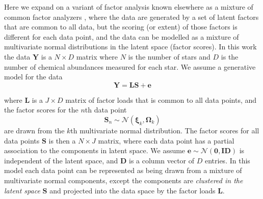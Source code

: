 \documentclass[twocolumn]{aastex62}
\newcommand{\vect}[1]{\boldsymbol{\mathbf{#1}}}
\renewcommand{\vec}[1]{\vect{#1}}
\newcommand{\data}{\textbf{Y}}
\newcommand{\vecdata}{\vec\data}
\newcommand{\eye}{\textbf{I}}
\newcommand{\factorloads}{\textbf{L}}
\newcommand{\factorscores}{\textbf{S}}
\newcommand{\specificvariance}{\vec{D}}
\newcommand{\NumData}{N}
\newcommand{\NumDimensions}{D}
\newcommand{\numdata}{n}
\newcommand{\NumLatentFactors}{J}
\newcommand{\numcomponents}{k}
\begin{document}
Here we expand on a variant of factor analysis known elsewhere as a mixture of common 
factor analyzers \citep{Baek:2010}, where the data are generated by a set of 
latent factors that are common to all data, but the scoring (or extent) of those
factors is different for each data point, and the data can be modelled as a
mixture of multivariate normal distributions in the latent space (factor scores).
In this work the data $\vecdata$ is a 
$\NumData \times \NumDimensions$ matrix where $\NumData$ is the number of 
stars and $\NumDimensions$ is the number of chemical abundances measured 
for each star. We assume a generative model for the data 
\begin{equation}
	\vecdata = \factorloads\factorscores + \vec{e}
	\label{eq:generative-model}
\end{equation}

\noindent{}where $\factorloads$ is a $\NumLatentFactors \times \NumDimensions$ 
matrix of factor loads that is common to all data points, and the factor scores 
for the $\numdata$th data point
\begin{equation}
	\factorscores_\numdata \sim \mathcal{N}(\vec\xi_\numcomponents, \vec\Omega_\numcomponents)
\end{equation}
\noindent{}are drawn from the $\numcomponents$th multivariate normal distribution.
The factor scores for all data points $\factorscores$ is then a 
$\NumData \times \NumLatentFactors$ matrix, where each data point has a partial
association to the components in latent space. 
We assume $\vec{e} \sim \mathcal{N}\left(\vec{0}, \eye\specificvariance\right)$
is independent of the latent space, and $\specificvariance$ is a
column vector of $\NumDimensions$ entries. 
In this model each data point can be represented as being drawn
from a mixture of multivariate normal components, except the components
are \emph{clustered in the latent space} $\factorscores$ and projected
into the data space by the factor loads $\factorloads$. 
\end{document}
